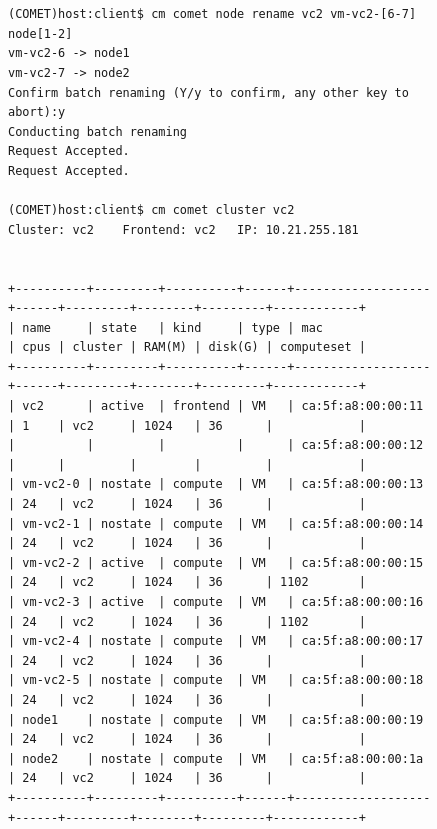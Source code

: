 \begin{figure}[htb] 
\begin{small}
\begin{verbatim}


(COMET)host:client$ cm comet node rename vc2 vm-vc2-[6-7] node[1-2]
vm-vc2-6 -> node1
vm-vc2-7 -> node2
Confirm batch renaming (Y/y to confirm, any other key to abort):y
Conducting batch renaming
Request Accepted.
Request Accepted.

(COMET)host:client$ cm comet cluster vc2
Cluster: vc2	Frontend: vc2	IP: 10.21.255.181


+----------+---------+----------+------+-------------------+------+---------+--------+---------+------------+
| name     | state   | kind     | type | mac               | cpus | cluster | RAM(M) | disk(G) | computeset |
+----------+---------+----------+------+-------------------+------+---------+--------+---------+------------+
| vc2      | active  | frontend | VM   | ca:5f:a8:00:00:11 | 1    | vc2     | 1024   | 36      |            |
|          |         |          |      | ca:5f:a8:00:00:12 |      |         |        |         |            |
| vm-vc2-0 | nostate | compute  | VM   | ca:5f:a8:00:00:13 | 24   | vc2     | 1024   | 36      |            |
| vm-vc2-1 | nostate | compute  | VM   | ca:5f:a8:00:00:14 | 24   | vc2     | 1024   | 36      |            |
| vm-vc2-2 | active  | compute  | VM   | ca:5f:a8:00:00:15 | 24   | vc2     | 1024   | 36      | 1102       |
| vm-vc2-3 | active  | compute  | VM   | ca:5f:a8:00:00:16 | 24   | vc2     | 1024   | 36      | 1102       |
| vm-vc2-4 | nostate | compute  | VM   | ca:5f:a8:00:00:17 | 24   | vc2     | 1024   | 36      |            |
| vm-vc2-5 | nostate | compute  | VM   | ca:5f:a8:00:00:18 | 24   | vc2     | 1024   | 36      |            |
| node1    | nostate | compute  | VM   | ca:5f:a8:00:00:19 | 24   | vc2     | 1024   | 36      |            |
| node2    | nostate | compute  | VM   | ca:5f:a8:00:00:1a | 24   | vc2     | 1024   | 36      |            |
+----------+---------+----------+------+-------------------+------+---------+--------+---------+------------+
\end{verbatim}
\end{small}
\end{figure}


